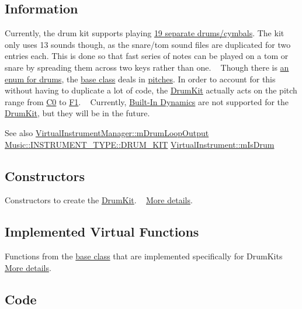 \hypertarget{group___doc_drum_DocDrumInfo}{}\subsection{Information}\label{group___doc_drum_DocDrumInfo}
Currently, the drum kit supports playing \hyperlink{group___music_enums_gade475b4382c7066d1af13e7c13c029b6}{19 separate drums/cymbals}. The kit only uses 13 sounds though, as the snare/tom sound files are duplicated for two entries each. This is done so that fast series of notes can be played on a tom or snare by spreading them across two keys rather than one. ~\newline
Though there is \hyperlink{group___music_enums_gade475b4382c7066d1af13e7c13c029b6}{an enum for drums}, the \hyperlink{group___v_i_base}{base class} deals in \hyperlink{group___music_enums_ga508f69b199ea518f935486c990edac1d}{pitches}. In order to account for this without having to duplicate a lot of code, the \hyperlink{class_drum_kit}{Drum\+Kit} actually acts on the pitch range from \hyperlink{group___music_enums_gga508f69b199ea518f935486c990edac1da9c5959e6f08f10d0edbadf5be1f33c53}{C0} to \hyperlink{group___music_enums_gga508f69b199ea518f935486c990edac1dae1dffc8709f31a4987c8a88334107e89}{F1}. ~\newline
 Currently, \hyperlink{group___audio_DefBID}{Built-\/\+In Dynamics} are not supported for the \hyperlink{class_drum_kit}{Drum\+Kit}, but they will be in the future. \begin{DoxySeeAlso}{See also}
\hyperlink{group___v_i_m_priv_ga5f71cb71d240042312dcc13b481b068d}{Virtual\+Instrument\+Manager\+::m\+Drum\+Loop\+Output} \hyperlink{group___music_enums_ggabfce60192305965558a36e368ebd67c3aceaaf30d57fed4b1c3f4b95c60a76df6}{Music\+::\+I\+N\+S\+T\+R\+U\+M\+E\+N\+T\+\_\+\+T\+Y\+P\+E\+::\+D\+R\+U\+M\+\_\+\+K\+IT} \hyperlink{group___v_i_base_pro_var_ga47dbd8aa02ab32b8f802adfd2d3d81de}{Virtual\+Instrument\+::m\+Is\+Drum}
\end{DoxySeeAlso}
\hypertarget{group___doc_drum_DocDrumConstruct}{}\subsection{Constructors}\label{group___doc_drum_DocDrumConstruct}
Constructors to create the \hyperlink{class_drum_kit}{Drum\+Kit}. ~\newline
 \hyperlink{group___drum_construct}{More details}.\hypertarget{group___doc_drum_DocDrumVirtFunc}{}\subsection{Implemented Virtual Functions}\label{group___doc_drum_DocDrumVirtFunc}
Functions from the \hyperlink{group___v_i_base}{base class} that are implemented specifically for Drum\+Kits ~\newline
 \hyperlink{group___drum_virt_func}{More details}.\hypertarget{group___doc_drum_DocDrumCode}{}\subsection{Code}\label{group___doc_drum_DocDrumCode}

